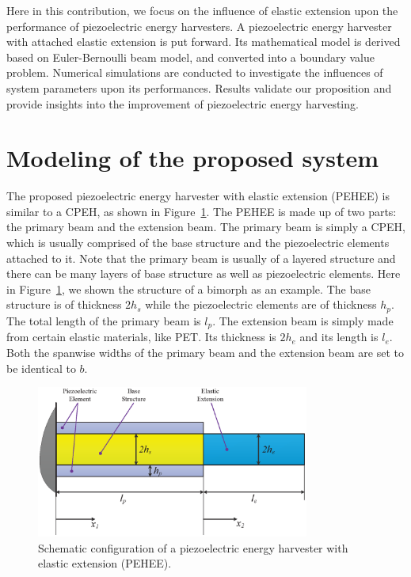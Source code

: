 \documentclass{elsarticle}
\begin{document}
Here in this contribution, we focus on the influence of elastic extension upon the performance of piezoelectric energy harvesters. A piezoelectric energy harvester with attached elastic extension is put forward. Its mathematical model is derived based on Euler-Bernoulli beam model, and converted into a boundary value problem. Numerical simulations are conducted to investigate the influences of system parameters upon its performances. Results validate our proposition and provide insights into the improvement of piezoelectric energy harvesting. 


\section{Modeling of the proposed system}

The proposed piezoelectric energy harvester with elastic extension (PEHEE) is similar to a CPEH, as shown in Figure~\ref{fig:fig_beam_configuration}. The PEHEE is made up of two parts: the primary beam and the extension beam. The primary beam is simply a CPEH, which is usually comprised of the base structure and the piezoelectric elements attached to it. Note that the primary beam is usually of a layered structure and there can be many layers of base structure as well as piezoelectric elements. Here in Figure~\ref{fig:fig_beam_configuration}, we shown the structure of a bimorph as an example. The base structure is of thickness $2h_s$ while the piezoelectric elements are of thickness $h_p$. The total length of the primary beam is $l_p$. The extension beam is simply made from certain elastic materials, like PET. Its thickness is $2h_e$ and its length is $l_e$. Both the spanwise widths of the primary beam and the extension beam are set to be identical to $b$.

\begin{figure}[!htbp]
    \centering
    \includegraphics[width=0.8\textwidth]{./fig_beam_configuration}
    \caption{Schematic configuration of a piezoelectric energy harvester with elastic extension (PEHEE). }
    \label{fig:fig_beam_configuration}
\end{figure}
\end{document}
